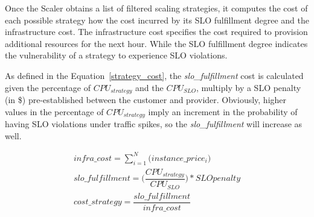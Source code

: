 

Once the Scaler obtains a list of filtered scaling strategies, it computes the cost of each possible strategy how the cost incurred by its SLO fulfillment degree and the infrastructure cost. The infrastructure cost specifies the cost required to provision additional resources for the next hour. While the SLO fulfillment degree indicates the vulnerability of a strategy to experience SLO violations. 

As defined in the Equation~\ref{strategy_cost}, the \emph{slo\_fulfillment} cost is calculated given the percentage of \emph{$CPU_{strategy}$} and the \emph{$CPU_{SLO}$}, multiply by a SLO penalty (in \$)  pre-established between the customer and provider. Obviously, higher values in the percentage of \emph{$CPU_{strategy}$} imply an increment in the probability of having SLO violations under traffic spikes, so the \emph{slo\_fulfillment} will increase as well. 


{\scriptsize
\begin{equation}\label{strategy_cost}
\begin{split}
infra\_cost = \sum_{i=1}^N \big( instance\_price_{i} \big) \\
slo\_fulfillment =  \bigg( \dfrac{ CPU_{strategy} } {CPU_{SLO}} \bigg) * SLO penalty \\
cost\_strategy = \dfrac{  slo\_fulfillment  } {infra\_cost}
\end{split}
\end{equation}
}


